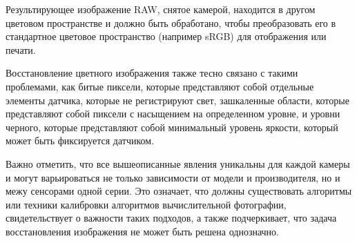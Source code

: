 
Результирующее изображение RAW, снятое камерой, находится в другом цветовом пространстве и должно быть обработано, чтобы преобразовать его в стандартное цветовое пространство (например sRGB) для отображения или печати. 

Восстановление цветного изображения также тесно связано с такими проблемами, как битые пиксели, которые представляют собой отдельные элементы датчика, которые не регистрируют свет, зашкаленные области, которые представляют собой пиксели с насыщением на определенном уровне, и уровни черного, которые представляют собой минимальный уровень яркости, который может быть фиксируется датчиком.



Важно отметить, что все вышеописанные явления уникальны для каждой камеры и могут варьироваться не только зависимости от модели и производителя, но и межу сенсорами одной серии. Это означает, что должны существовать алгоритмы или техники калибровки алгоритмов вычислительной фотографии, свидетельствует о важности таких подходов, а также подчеркивает, что задача восстановления изображения не может быть решена однозначно.